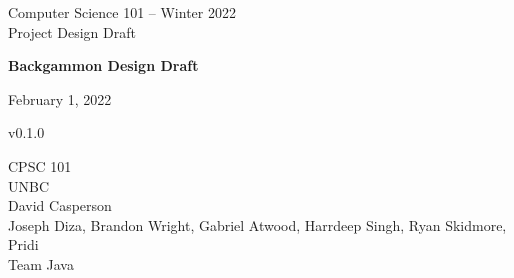 \begin{titlepage}
    \begin{center}
        \vspace{1.5cm}
        
        \Large
        Computer Science 101 -- Winter 2022 \\
        Project Design Draft
        
        \vspace*{4cm}
            
        \huge
        \textbf{Backgammon Design Draft}
        \vspace*{0.4cm}

        \large
        February 1, 2022 \\
        \vspace*{0.2cm}

        \footnotesize
        v0.1.0
        \vspace{1.5cm}

        \vfill
        CPSC 101 \\
        UNBC \\
        David Casperson \\

        \vspace{0.8cm}
        Joseph Diza, Brandon Wright, Gabriel Atwood, Harrdeep Singh, Ryan Skidmore, Pridi \\
        Team Java
    \end{center}
\end{titlepage}
